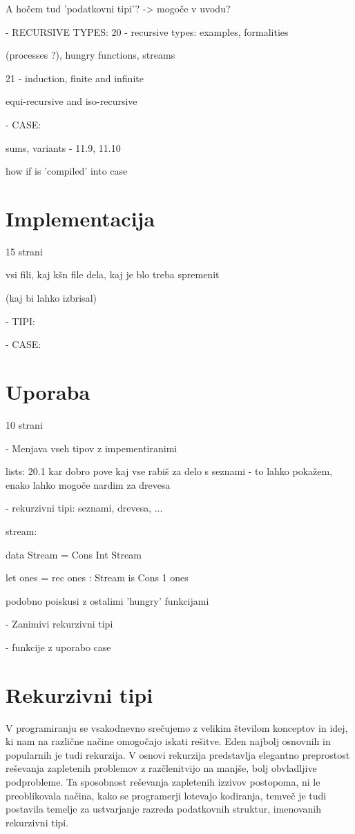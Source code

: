 \documentclass[12pt,a4paper,openany]{book}
\begin{document}
A hočem tud 'podatkovni tipi'? -> mogoče v uvodu?

- RECURSIVE TYPES:  	20 - recursive types: examples, formalities

                        (processes ?), hungry functions, streams

    	            	21 - induction, finite and infinite

                        equi-recursive and iso-recursive

- CASE: 

        sums, variants -  11.9, 11.10

        how if is 'compiled' into case

\chapter{Implementacija}
15 strani

vsi fili, kaj kšn file dela, kaj je blo treba spremenit

(kaj bi lahko izbrisal)

- TIPI:

- CASE:

\chapter{Uporaba}
10 strani

- Menjava vseh tipov z impementiranimi

lists: 20.1 kar dobro pove kaj vse rabiš za delo s seznami - to lahko pokažem, enako lahko mogoče nardim za drevesa

- rekurzivni tipi: seznami, drevesa, ...

stream:

data Stream = Cons Int Stream

let ones = rec ones : Stream is Cons 1 ones

podobno poiskusi z ostalimi 'hungry' funkcijami

- Zanimivi rekurzivni tipi

- funkcije z uporabo case


\newpage
\chapter{Rekurzivni tipi} %
V programiranju se vsakodnevno srečujemo z velikim številom konceptov in idej, ki nam na različne načine omogočajo iskati rešitve. Eden najbolj osnovnih in popularnih je tudi rekurzija.
V osnovi rekurzija predstavlja elegantno preprostost reševanja zapletenih problemov z razčlenitvijo na manjše, bolj obvladljive podprobleme. Ta sposobnost reševanja zapletenih izzivov 
postopoma, ni le preoblikovala načina, kako se programerji lotevajo kodiranja, temveč je tudi postavila temelje za ustvarjanje razreda podatkovnih struktur, imenovanih rekurzivni tipi.
\end{document}
